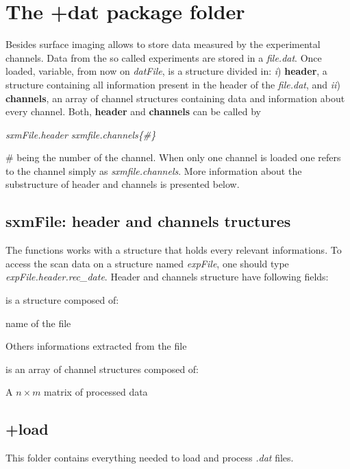 \section{The +dat package folder}

Besides surface imaging \nanonis allows to store data measured by the experimental channels. Data from the so called experiments are stored in a \emph{file.dat}.
Once loaded, variable, from now on \emph{datFile}, is a structure divided in: \emph{i}) \textbf{header}, a structure containing all information present in the header of the \emph{file.dat}, and \emph{ii}) \textbf{channels}, an array of channel structures containing data and information about every channel.
Both, \textbf{header} and \textbf{channels} can be called by
\begin{center}
\emph{sxmFile.header} \quad {} \quad \emph{sxmfile.channels\{\#\}}
\end{center}
\# being the number of the channel. When only one channel is loaded one refers to the channel simply as \emph{sxmfile.channels}. 
More information about the substructure of header and channels is presented below.


\subsection{sxmFile: header and channels tructures}
\label{sec:sxmFile}

The functions works with a structure that holds every relevant informations. To access the scan data on a structure named \emph{expFile}, one should type \emph{expFile.header.rec\_date}. Header and channels structure have following fields:

\bdf
\item[header] is a structure composed of:
  \bdf
  \item[scan\_file] name of the file
  \item[$\cdots$] Others informations extracted from the file
  \edf

\item[experiments] is an array of channel structures composed of:
  \bdf
  \item[data] A $n\times m$ matrix of processed data
  \edf
\edf


\subsection{+load}
This folder contains everything needed to load and process \emph{.dat} files.
